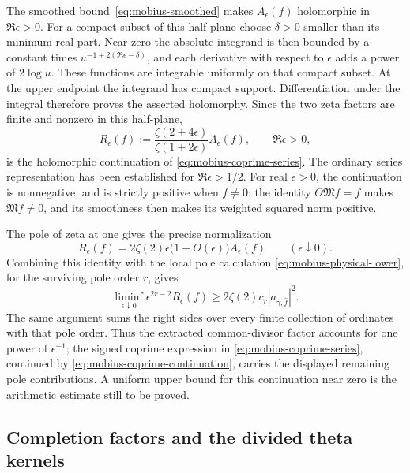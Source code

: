 The smoothed bound~\eqref{eq:mobius-smoothed} makes
\(A_\epsilon(f)\) holomorphic in \(\Re\epsilon>0\).
For a compact subset of this half-plane choose \(\delta>0\) smaller
than its minimum real part. Near zero the absolute integrand is then
bounded by a constant times
\(u^{-1+2(\Re\epsilon-\delta)}\), and each derivative with respect
to \(\epsilon\) adds a power of \(2\log u\). These functions
are integrable uniformly on that compact subset. At the upper endpoint
the integrand has compact support. Differentiation under the integral
therefore proves the asserted holomorphy. Since the two zeta factors
are finite and nonzero in this half-plane,
\begin{equation}\label{eq:mobius-coprime-continuation}
 R_\epsilon(f):=
 \frac{\zeta(2+4\epsilon)}{\zeta(1+2\epsilon)}A_\epsilon(f),
 \qquad \Re\epsilon>0,
\end{equation}
is the holomorphic continuation of
\eqref{eq:mobius-coprime-series}. The ordinary series representation
has been established for \(\Re\epsilon>1/2\).
For real \(\epsilon>0\), the continuation is nonnegative, and is
strictly positive when \(f\ne0\): the identity
\(\Theta\mathfrak M f=f\) makes \(\mathfrak M f\ne0\),
and its smoothness then makes its weighted squared norm positive.

The pole of zeta at one gives the precise normalization
\begin{equation}\label{eq:mobius-coprime-asymptotic}
 R_\epsilon(f)=2\zeta(2)\epsilon\bigl(1+O(\epsilon)\bigr)
                      A_\epsilon(f)
              \qquad(\epsilon\downarrow0).
\end{equation}
Combining this identity with the local pole calculation
\eqref{eq:mobius-physical-lower}, for the surviving pole order \(r\),
gives
\begin{equation}\label{eq:mobius-coprime-pole}
 \liminf_{\epsilon\downarrow0}
      \epsilon^{2r-2}R_\epsilon(f)
 \ge 2\zeta(2)c_r\left|a_{\gamma,\widehat f}\right|^2.
\end{equation}
The same argument sums the right sides over every finite collection
of ordinates with that pole order. Thus the extracted common-divisor
factor accounts for one power of \(\epsilon^{-1}\); the signed
coprime expression in \eqref{eq:mobius-coprime-series}, continued by
\eqref{eq:mobius-coprime-continuation}, carries the displayed remaining
pole contributions. A uniform upper bound for this continuation near
zero is the arithmetic estimate still to be proved.

\subsection{Completion factors and the divided theta kernels}

